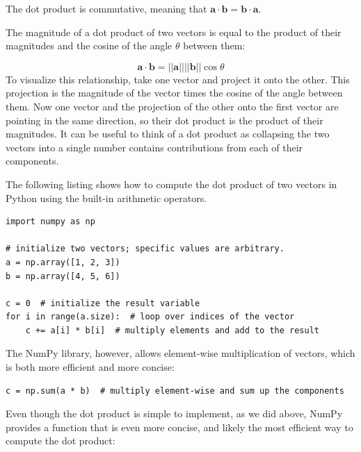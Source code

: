 \documentclass[12pt]{article}
\numberwithin{equation}{section}
\numberwithin{figure}{section}
\numberwithin{table}{section}
\begin{document}
The dot product is commutative, meaning that
$\mathbf{a} \cdot \mathbf{b} = \mathbf{b} \cdot \mathbf{a}$.

The magnitude of a dot product of two vectors is equal to the product of their
magnitudes and the cosine of the angle $\theta$ between them:

\begin{equation}
  \mathbf{a} \cdot \mathbf{b} = ||\mathbf{a}|| ||\mathbf{b}|| \cos{\theta}
\end{equation}
To visualize this relationship, take one vector and project it onto the other.
This projection is the magnitude of the vector times the cosine of the angle
between them.
Now one vector and the projection of the other onto the first vector are
pointing in the same direction, so their dot product is the product of their
magnitudes.
It can be useful to think of a dot product as collapsing the two vectors into a
single number contains contributions from each of their components.

The following listing shows how to compute the dot product of two vectors
in Python using the built-in arithmetic operators.

\begin{listing}[h]
\begin{verbatim}
import numpy as np

# initialize two vectors; specific values are arbitrary.
a = np.array([1, 2, 3])
b = np.array([4, 5, 6])

c = 0  # initialize the result variable
for i in range(a.size):  # loop over indices of the vector
    c += a[i] * b[i]  # multiply elements and add to the result
\end{verbatim}
\label{lst:dot_product_arithmetic}
\end{listing}
The NumPy library, however, allows element-wise multiplication of vectors,
which is both more efficient and more concise:

\begin{listing}[h]
\begin{verbatim}
c = np.sum(a * b)  # multiply element-wise and sum up the components
\end{verbatim}
\label{lst:dot_product_numpy}
\end{listing}
Even though the dot product is simple to implement, as we did above, NumPy
provides a function that is even more concise, and likely the most efficient
way to compute the dot product:
\end{document}
